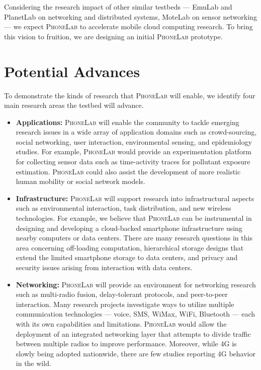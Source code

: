 Considering the research impact of other similar testbeds --- EmuLab and
PlanetLab on networking and distributed systems, MoteLab on sensor networking
--- we expect {\scshape PhoneLab} to accelerate mobile cloud computing
research. To bring this vision to fruition, we are designing an initial
{\scshape PhoneLab} prototype.

\section{Potential Advances} To demonstrate the kinds of research that
{\scshape PhoneLab} will enable, we identify four main research areas the
testbed will advance. 

\begin{itemize}

\item \textbf{Applications:} {\scshape PhoneLab} will enable the community to
tackle emerging research issues in a wide array of application domains such
as crowd-sourcing, social networking, user interaction, environmental
sensing, and epidemiology studies. For example, {\scshape PhoneLab} would
provide an experimentation platform for collecting sensor data such as
time-activity traces for pollutant exposure estimation. {\scshape PhoneLab}
could also assist the development of more realistic human mobility or social
network models.

\item \textbf{Infrastructure:} {\scshape PhoneLab} will support research into
infrastructural aspects such as environmental interaction, task distribution,
and new wireless technologies. For example, we believe that {\scshape
PhoneLab} can be instrumental in designing and developing a cloud-backed
smartphone infrastructure using nearby computers or data centers. There are
many research questions in this area concerning off-loading computation,
hierarchical storage designs that extend the limited smartphone storage to
data centers, and privacy and security issues arising from interaction with
data centers.

\item \textbf{Networking:} {\scshape PhoneLab} will provide an 
environment for networking research such as multi-radio fusion,
delay-tolerant protocols, and peer-to-peer interaction. Many research
projects investigate ways to utilize multiple communication technologies ---
voice, SMS, WiMax, WiFi, Bluetooth --- each with its own capabilities and
limitations. {\scshape PhoneLab} would allow the deployment of an integrated
networking layer that attempts to divide traffic between multiple radios to
improve performance. Moreover, while 4G is slowly being adopted nationwide,
there are few studies reporting 4G behavior in the wild.


\end{itemize}
